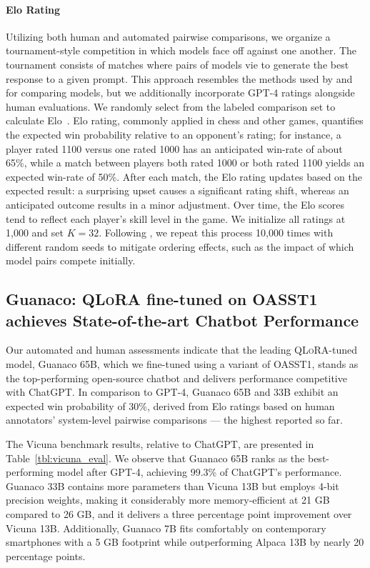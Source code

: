 \paragraph{Elo Rating} Utilizing both human and automated pairwise comparisons, we organize a tournament-style competition in which models face off against one another. The tournament consists of matches where pairs of models vie to generate the best response to a given prompt. This approach resembles the methods used by \citet{bai2022training} and \citet{vicuna2023} for comparing models, but we additionally incorporate GPT-4 ratings alongside human evaluations. We randomly select from the labeled comparison set to calculate Elo~\citep{elo1967proposed,elo1978rating}. Elo rating, commonly applied in chess and other games, quantifies the expected win probability relative to an opponent's rating; for instance, a player rated 1100 versus one rated 1000 has an anticipated win-rate of about 65\%, while a match between players both rated 1000 or both rated 1100 yields an expected win-rate of 50\%. After each match, the Elo rating updates based on the expected result: a surprising upset causes a significant rating shift, whereas an anticipated outcome results in a minor adjustment. Over time, the Elo scores tend to reflect each player’s skill level in the game. We initialize all ratings at 1,000 and set $K=32$. Following \citet{vicuna2023}, we repeat this process 10,000 times with different random seeds to mitigate ordering effects, such as the impact of which model pairs compete initially.

\subsection{\textbf{Guanaco}: \textsc{QLoRA} fine-tuned on OASST1 achieves State-of-the-art Chatbot Performance} Our automated and human assessments indicate that the leading \textsc{QLoRA}-tuned model, {Guanaco} 65B, which we fine-tuned using a variant of OASST1, stands as the top-performing open-source chatbot and delivers performance competitive with ChatGPT. In comparison to GPT-4, {Guanaco} 65B and 33B exhibit an expected win probability of 30\%, derived from Elo ratings based on human annotators’ system-level pairwise comparisons — the highest reported so far.

The Vicuna benchmark \cite{vicuna2023} results, relative to ChatGPT, are presented in Table~\ref{tbl:vicuna_eval}. We observe that {Guanaco} 65B ranks as the best-performing model after GPT-4, achieving 99.3\% of ChatGPT’s performance. {Guanaco} 33B contains more parameters than Vicuna 13B but employs 4-bit precision weights, making it considerably more memory-efficient at 21 GB compared to 26 GB, and it delivers a three percentage point improvement over Vicuna 13B. Additionally, {Guanaco} 7B fits comfortably on contemporary smartphones with a 5 GB footprint while outperforming Alpaca 13B by nearly 20 percentage points.

